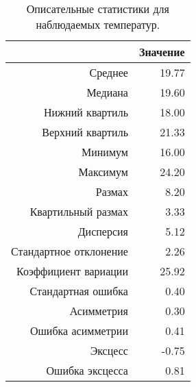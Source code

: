 \begin{table}[ht]
\centering
\begin{tabular}{rr}
  \hline
 & Значение \\ 
  \hline
Среднее & 19.77 \\ 
  Медиана & 19.60 \\ 
  Нижний квартиль & 18.00 \\ 
  Верхний квартиль & 21.33 \\ 
  Минимум & 16.00 \\ 
  Максимум & 24.20 \\ 
  Размах & 8.20 \\ 
  Квартильный размах & 3.33 \\ 
  Дисперсия & 5.12 \\ 
  Стандартное отклонение & 2.26 \\ 
  Коэффициент вариации & 25.92 \\ 
  Стандартная ошибка & 0.40 \\ 
  Асимметрия & 0.30 \\ 
  Ошибка асимметрии & 0.41 \\ 
  Эксцесс & -0.75 \\ 
  Ошибка эксцесса & 0.81 \\ 
   \hline
\end{tabular}
\caption{Описательные статистики для наблюдаемых температур.} 
\label{table:dstats}
\end{table}
